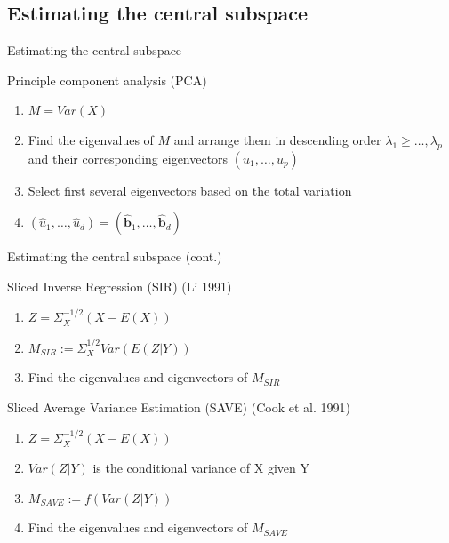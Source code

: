 \documentclass[ignorenonframetext,]{beamer}
\providecommand{\tightlist}{%
  \setlength{\itemsep}{0pt}\setlength{\parskip}{0pt}}
\begin{document}
\subsection{Estimating the central
subspace}\label{estimating-the-central-subspace}

\begin{frame}{Estimating the central subspace}

\begin{block}{Principle component analysis (PCA)}

\begin{enumerate}
\def\labelenumi{\arabic{enumi}.}
\tightlist
\item
  \(M = {Var}(X)\)\\
\item
  Find the eigenvalues of \(M\) and arrange them in descending order
  \(\lambda_1 \geq \dots, \lambda_p\) and their corresponding
  eigenvectors \((u_1, \dots, u_p)\)\\
\item
  Select first several eigenvectors based on the total variation\\
\item
  \((\hat u_1, \dots, \hat u_d) = (\hat{\mathbf{b}}_1, \dots, \hat{\mathbf{b}}_d)\)
\end{enumerate}

\end{block}

\end{frame}

\begin{frame}{Estimating the central subspace (cont.)}

\begin{block}{Sliced Inverse Regression (SIR) (Li 1991)}

\begin{enumerate}
\def\labelenumi{\arabic{enumi}.}
\tightlist
\item
  \(Z = \Sigma_X^{-1/2}(X - E(X))\)
\item
  \(M_{SIR} := \Sigma_X^{1/2}Var(E(Z|Y))\)
\item
  Find the eigenvalues and eigenvectors of \(M_{SIR}\)
\end{enumerate}

\end{block}

\begin{block}{Sliced Average Variance Estimation (SAVE) (Cook et al.
1991)}

\begin{enumerate}
\def\labelenumi{\arabic{enumi}.}
\tightlist
\item
  \(Z = \Sigma_X^{-1/2}(X - E(X))\)
\item
  \(Var(Z|Y)\) is the conditional variance of X given Y
\item
  \(M_{SAVE} := f(Var(Z|Y))\)
\item
  Find the eigenvalues and eigenvectors of \(M_{SAVE}\)
\end{enumerate}

\end{block}

\end{frame}
\end{document}
